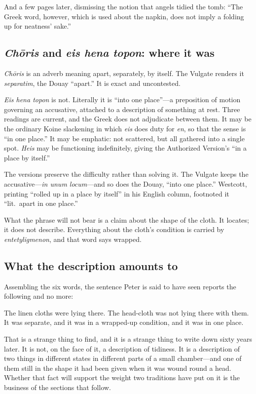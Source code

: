 And a few pages later, dismissing the notion that angels tidied the tomb:
``The Greek word, however, which is used about the napkin, does not imply a
folding up for neatness' sake.''

\subsection{\emph{Ch\=oris} and \emph{eis hena topon}: where it was}

\emph{Ch\=oris} is an adverb meaning apart, separately, by itself. The Vulgate
renders it \emph{separatim}, the Douay ``apart.'' It is exact and uncontested.

\emph{Eis hena topon} is not. Literally it is ``into one place''---a
preposition of motion governing an accusative, attached to a description of
something at rest. Three readings are current, and the Greek does not
adjudicate between them. It may be the ordinary Koine slackening in which
\emph{eis} does duty for \emph{en}, so that the sense is ``in one place.'' It
may be emphatic: not scattered, but all gathered into a single spot.
\emph{Heis} may be functioning indefinitely, giving the Authorized Version's
``in a place by itself.''

The versions preserve the difficulty rather than solving it. The Vulgate keeps
the accusative---\emph{in unum locum}---and so does the Douay, ``into one
place.'' Westcott, printing ``rolled up in a place by itself'' in his English
column, footnoted it ``lit.\ apart in one place.''

What the phrase will not bear is a claim about the shape of the cloth. It
locates; it does not describe. Everything about the cloth's condition is
carried by \emph{entetyligmenon}, and that word says wrapped.

\subsection{What the description amounts to}

Assembling the six words, the sentence Peter is said to have seen reports the
following and no more:

\begin{studyframe}\small
The linen cloths were lying there. The head-cloth was not lying there with
them. It was separate, and it was in a wrapped-up condition, and it was in one
place.
\end{studyframe}

That is a strange thing to find, and it is a strange thing to write down sixty
years later. It is not, on the face of it, a description of tidiness. It is a
description of two things in different states in different parts of a small
chamber---and one of them still in the shape it had been given when it was
wound round a head. Whether that fact will support the weight two traditions
have put on it is the business of the sections that follow.
